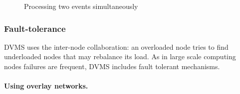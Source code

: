 \begin{figure}[h]
%
%
%
%
\caption{Processing two events simultaneously\label{fig:dvms_pte}}
\end{figure}


\subsubsection{Fault-tolerance}

DVMS uses the inter-node collaboration: an overloaded node tries to find
underloaded nodes that may rebalance its load. As in large scale computing
nodes failures are frequent, DVMS includes fault tolerant mechanisms.



\paragraph{Using overlay networks.}

